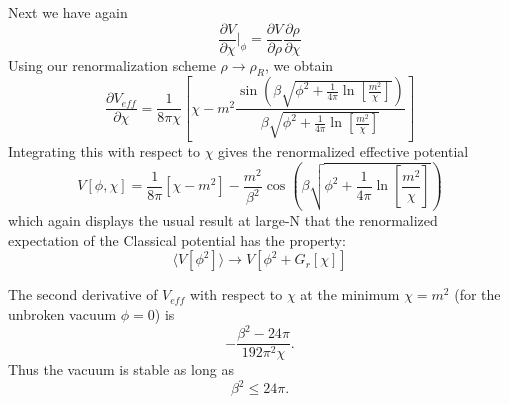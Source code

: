 \documentclass[a4paper,prd,preprint,superscriptaddress,showpacs,byrevtex]{revtex4}
\begin{document}
Next we have again
\begin{equation}
\frac{\partial V} {\partial \chi}|_{\phi} = \frac{\partial V} {\partial
\rho} \frac{\partial \rho} {\partial \chi}
\end{equation}
Using our renormalization scheme $ \rho \rightarrow \rho_R$, we obtain
\begin{equation}
\frac{\partial V_{eff}} {\partial \chi}= \frac{1} {8 \pi \chi} \left[\chi -
{m^2}
\frac {\sin \left( \beta \sqrt{\phi^2+ \frac{1}{4 \pi}
\ln[\frac{m^2}{\chi}]} \right)}{\beta \sqrt{
\phi^2 +\frac{1}{4
\pi}
\ln[\frac{m^2}{\chi}]}}   \right]
\end{equation}
Integrating this with respect to $\chi$ gives the renormalized effective
potential
\begin{equation}
V[\phi,\chi] = \frac{1}{8 \pi} [\chi -m^2] -\frac{m^2}{\beta^2} \cos \left(
\beta \sqrt{\phi^2+
\frac{1}{4 \pi} \ln[\frac{m^2}{\chi}]} \right)
\end{equation}
which again displays the usual result at large-N that the renormalized
expectation of the Classical potential has the property:
\begin{equation}
\langle V[\phi^2]\rangle \rightarrow  V[\phi^2+ G_r[\chi] ]
\end{equation}

The second derivative of $V_{eff}$ with respect to $\chi$ at the minimum $\chi=
m^2$ (for the unbroken vacuum
$\phi=0$)
is
\begin{equation}
- \frac{\beta^2- 24 \pi}{192 \pi^2 \chi}.
\end{equation}
Thus the vacuum is stable as long as
\begin{equation}
\beta^2 \leq 24 \pi.
\end{equation}
\end{document}
